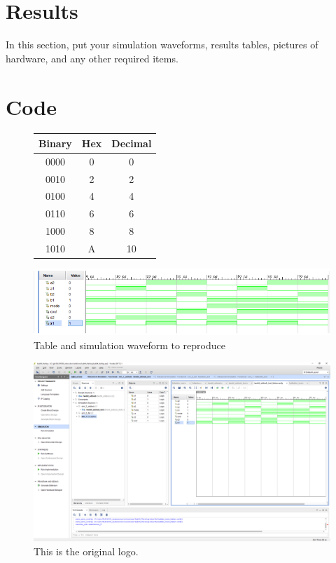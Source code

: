 \documentclass[11pt]{article}
\begin{document}
	
\section*{Results}

In this section, put your simulation waveforms, results tables, pictures of hardware, and any other required items.

\section*{Code}

\begin{figure}[ht]\centering
	\begin{tabular}{c|c|c}
		\toprule
		Binary & Hex & Decimal \\
		\midrule
		0000 & 0 & 0 \\
		0010 & 2 & 2 \\
		0100 & 4 & 4 \\
		0110 & 6 & 6 \\
		1000 & 8 & 8 \\
		1010 & A & 10 \\
		\bottomrule
	\end{tabular}\medskip

	\centering
	\includegraphics[width=0.7\linewidth]{Lab1F1}
	\caption{Table and simulation waveform to reproduce}
	\label{fig:lab1table}
\end{figure}

\begin{figure}[ht]\centering
	\includegraphics[width=1\textwidth]{Lab1Table}
	\caption{This is the original logo.}
	\label{fig:original_logo}
\end{figure}
\end{document}
